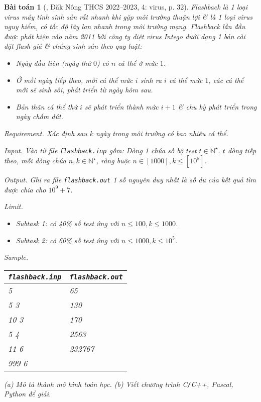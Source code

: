 \documentclass{article}
\newtheorem{baitoan}{Bài toán}
\begin{document}
\begin{baitoan}[\cite{Trung_THCS_Tin}, Đăk Nông THCS 2022--2023, 4: virus, p. 32]
	Flashback là 1 loại virus máy tính sinh sản rất nhanh khi gặp môi trường thuận lợi \& là 1 loại virus nguy hiểm, có tốc độ lây lan nhanh trong môi trường mạng. Flashback lần đầu được phát hiện vào năm 2011 bởi công ty diệt virus Intego dưới dạng 1 bản cài đặt flash giả \& chúng sinh sản theo quy luật:
	\begin{itemize}
		\item Ngày đầu tiên (ngày thứ $0$) có $n$ cá thể ở mức $1$.
		\item Ở mỗi ngày tiếp theo, mỗi cá thể mức $i$ sinh ra $i$ cá thể mức $1$, các cá thể mới sẽ sinh sôi, phát triển từ ngày hôm sau.
		\item Bản thân cá thể thứ $i$ sẽ phát triển thành mức $i + 1$ \& chu kỳ phát triển trong ngày chấm dứt.
	\end{itemize}
	\item {\sf Requirement.} Xác định sau $k$ ngày trong môi trường có bao nhiêu cá thể.
	\item {\sf Input.} Vào từ file {\tt flashback.inp} gồm: Dòng 1 chứa số bộ test $t\in\mathbb{N}^\star$. $t$ dòng tiếp theo, mỗi dòng chứa $n,k\in\mathbb{N}^\star$, ràng buộc $n\in[1000],k\le[10^5]$.
	\item {\sf Output.} Ghi ra file {\tt flashback.out} 1 số nguyên duy nhất là số dư của kết quả tìm được chia cho $10^9 + 7$.
	\item {\sf Limit.}
	\begin{itemize}
		\item Subtask 1: có 40\% số test ứng với $n\le100,k\le1000$.
		\item Subtask 2: có 60\% số test ứng với $n\le1000,k\le10^5$.
	\end{itemize}
	\item {\sf Sample.}
	\begin{table}[H]
		\centering
		\begin{tabular}{|l|l|}
			\hline
			{\tt flashback.inp} & {\tt flashback.out} \\
			\hline
			5 & 65 \\
			5 3 & 130 \\
			10 3 & 170 \\
			5 4 & 2563 \\
			11 6 & 232767 \\
			999 6 & \\
			\hline
		\end{tabular}
	\end{table}
	\noindent(a) Mô tả thành mô hình toán học. (b) Viết chương trình {\sf C{\tt/}C++, Pascal, Python} để giải.
\end{baitoan}
\end{document}

